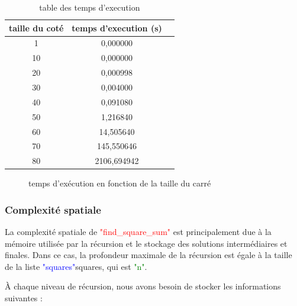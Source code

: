 \documentclass{article}
\begin{document}
\begin{table}[t]
    \centering
    \begin{tabular}{|c|c|c|}
    \hline
        taille du coté & temps d'execution (s) \\ \hline
        1 & 0,000000 \\ \hline
        10 & 0,000000 \\ \hline
        20  & 0,000998 \\ \hline
        30  & 0,004000 \\ \hline
        40  & 0,091080 \\ \hline
        50  & 1,216840 \\ \hline
        60 & 14,505640 \\ \hline
        70 & 145,550646 \\ \hline
        80 &  2106,694942 \\ \hline
    \end{tabular}
    \caption{table des temps d’execution }
    \label{tab1}
\end{table}

\begin{figure}[htbp]
  \centering
  
  \caption{temps d'exécution en fonction de la taille du carré}
  \label{fig2}
\end{figure}



\subsubsection{Complexité spatiale }
La complexité spatiale de \textcolor{red}{"find\_square\_sum"} est principalement due à la mémoire utilisée par la récursion et le stockage des solutions intermédiaires et finales. Dans ce cas, la profondeur maximale de la récursion est égale à la taille de la liste \textcolor{blue}{"squares"}squares, qui est \textcolor{green}{"n"}.\newline

À chaque niveau de récursion, nous avons besoin de stocker les informations suivantes :\newline
\end{document}

